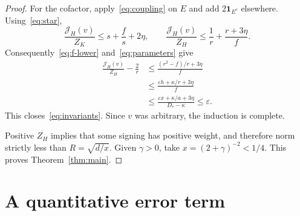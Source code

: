 \documentclass[11pt]{article}
\numberwithin{equation}{section}
\theoremstyle{remark}
\begin{document}
\begin{proof}
For the cofactor, apply~\eqref{eq:coupling} on $E$ and add
$2\mathbf1_{E^c}$ elsewhere. Using~\eqref{eq:star},
\[
 \frac{\mathcal J_H(v)}{Z_K}
 \le s+\frac f s+2\eta,
 \qquad
 \frac{\mathcal J_H(v)}{Z_H}
 \le\frac1r+\frac{r+3\eta}{f}.
\]
Consequently~\eqref{eq:f-lower} and~\eqref{eq:parameters} give
\begin{align*}
 \frac{\mathcal J_H(v)}{Z_H}-\frac2r
 &\le\frac{(r^2-f)/r+3\eta}{f}\\
 &\le\frac{\varepsilon h+\kappa/r+3\eta}{f}\\
 &\le\frac{\varepsilon x+\kappa/a+3\eta}{D_*-\kappa}
 \le\varepsilon.
\end{align*}
This closes~\eqref{eq:invariants}.
Since $v$ was arbitrary, the induction is complete.

Positive $Z_H$ implies that some signing has positive weight, and
therefore norm strictly less than $R=\sqrt{d/x}$.
Given $\gamma>0$, take $x=(2+\gamma)^{-2}<1/4$.
This proves Theorem~\ref{thm:main}.
\end{proof}


\section{A quantitative error term}\label{sec:rate}
\end{document}
